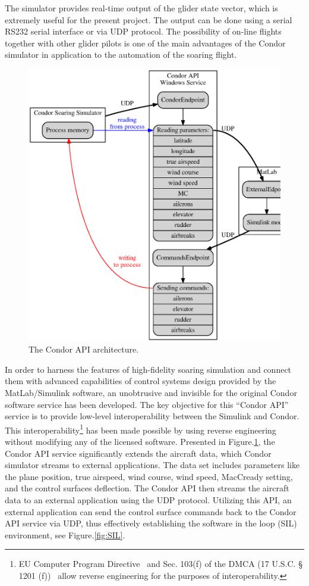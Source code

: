\documentclass[letterpaper, 10 pt, conference]{ieeeconf}  %
\begin{document}
The simulator provides real-time output of the glider state vector, which is extremely useful for the present project. The output can be done using a serial RS232 serial interface or via UDP protocol. The possibility of on-line flights together with other glider pilots is one of the main advantages of the Condor simulator in application to the automation of the soaring flight.
\begin{figure}[thpb]
  \centering
  \includegraphics[scale=0.3]{Figures/api_arch.eps}
  \caption{The Condor API architecture.}
  \label{fig:api_arch}
\end{figure}
In order to harness the features of high-fidelity soaring simulation and connect them with advanced capabilities of control systems design provided by the MatLab/Simulink software, an unobtrusive and invisible for the original Condor software service has been developed. The key objective for this ``Condor API'' service is to provide low-level interoperability between the Simulink and Condor. This interoperability\footnote{EU Computer Program Directive~\cite{EU_CPD:2009:Online} and Sec. 103(f) of the DMCA (17 U.S.C. § 1201 (f))~\cite{DMCA:2013:Online} allow reverse engineering for the purposes of interoperability.} has been made possible by using reverse engineering without modifying any of the licensed software. Presented in Figure.\ref{fig:api_arch}, the Condor API service significantly extends the aircraft data, which Condor simulator streams to external applications. The data set includes parameters like the plane position, true airspeed, wind course, wind speed, MacCready setting, and the control surfaces deflection. The Condor API then streams the aircraft data to an external application using the UDP protocol. Utilizing this API, an external application can send the control surface commands back to the Condor API service via UDP, thus effectively establishing the software in the loop (SIL) environment, see Figure.\ref{fig:SIL}.
\end{document}
